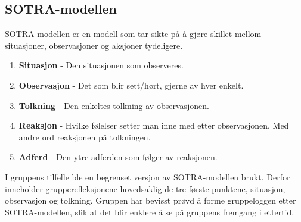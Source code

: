 \subsection{SOTRA-modellen}
SOTRA modellen er en modell som tar sikte på å gjøre skillet mellom situasjoner, observasjoner og aksjoner tydeligere. 

\begin{enumerate}
  \item \textbf{Situasjon} - Den situasjonen som observeres.
  \item \textbf{Observasjon} - Det som blir sett/hørt, gjerne av hver enkelt. 
  \item \textbf{Tolkning} - Den enkeltes tolkning av observasjonen. 
  \item \textbf{Reaksjon} - Hvilke følelser setter man inne med etter observasjonen. Med andre ord reaksjonen på tolkningen. 
  \item \textbf{Adferd} - Den ytre adferden som følger av reaksjonen. 
\end{enumerate}

I gruppens tilfelle ble en begrenset versjon av SOTRA-modellen brukt. 
Derfor inneholder grupperefleksjonene hovedsaklig de tre første punktene, situasjon, observasjon og tolkning. 
Gruppen har bevisst prøvd å forme gruppeloggen etter SOTRA-modellen, slik at det blir enklere å se på gruppens fremgang i ettertid. 

